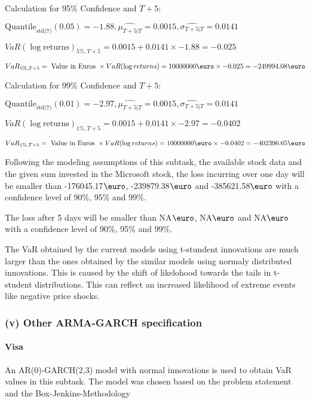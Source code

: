 Calculation for 95\% Confidence and $T+5$:

\indent\indent $\text{Quantile}_\text{std(7)}(0.05) = -1.88,\hat{\mu_{T+5|T}} = 0.0015, \hat{\sigma_{T+5|T}} = 0.0141$

\indent\indent $VaR(\log \text{returns})_{5\%, T + 5} = 0.0015 + 0.0141\times-1.88 = -0.025$

\indent\indent $VaR_{5\%, T + 5} = \text{ Value in Euros } \times VaR(\log returns) = 10 000 000 \text{\euro} \times-0.025 = -249994.08 \text{\euro}$\newline




Calculation for 99\% Confidence and $T+5$:

\indent\indent $\text{Quantile}_\text{std(7)}(0.01) = -2.97,\hat{\mu_{T+5|T}} = 0.0015, \hat{\sigma_{T+5|T}} = 0.0141$

\indent\indent $VaR(\log \text{returns})_{1\%, T + 5} = 0.0015 + 0.0141\times-2.97 = -0.0402$

\indent\indent $VaR_{1\%, T + 5} = \text{ Value in Euros } \times VaR(\log returns) = 10 000 000 \text{\euro} \times-0.0402 = -402396.65 \text{\euro}$\newline


Following the modeling assumptions of this subtask, the available stock data and the given sum invested in the Microsoft stock, the loss incurring over one day will be smaller than -176045.17$\text{\euro}$, -239879.38$\text{\euro}$  and -385621.58$\text{\euro}$  with a confidence level of 90\%, 95\%  and 99\%.

The loss after 5 days will be smaller than NA$\text{\euro}$, NA$\text{\euro}$  and NA$\text{\euro}$  with a confidence level of 90\%, 95\%  and 99\%.

The VaR obtained by the current models using t-stundent innovations are much larger than the ones obtained by the similar models using normaly distributed innovations. This is caused by the shift of likelohood towards the tails in t-student distributions. This can reflect an increased likelihood of extreme events like negative price shocks.
\subsubsection{(v) Other ARMA-GARCH specification}

\paragraph{Visa}
 An AR(0)-GARCH(2,3) model with normal innovations is used to obtain VaR values in this subtask. The model was chosen based on the problem statement and the Box-Jenkins-Methodology





